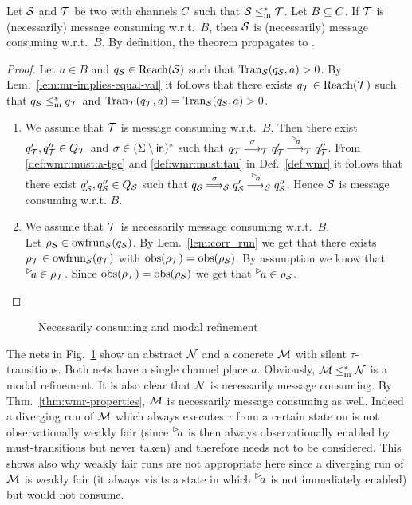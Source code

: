 \begin{theorem}\label{thm:wmr-properties}
    Let $\S$ and $\T$ be two \MAIOTSs with channels $\chan$  such that $\S \mrw \T$.
Let $B \subseteq \chan$. 
If $\T$ is (necessarily) message consuming w.r.t.\ $B$, then $\S$ is (necessarily) message consuming w.r.t.\ $B$.
By definition, the theorem propagates to \MAIOPNs.
\end{theorem}
\begin{proof}
	Let $a \in B$ and $q_\S \in \reach(\S)$ such that $\val_\S(q_\S,a) > 0$.
 By Lem.~\ref{lem:mr-implies-equal-val} it follows that there exists $q_\T \in \reach(\T)$ such that $q_\S \mrw q_\T$
and $\val_\T(q_\T,a) = \val_\S(q_\S,a) > 0$.
\begin{enumerate}
\item We assume that $\T$ is message consuming w.r.t.\ $B$.
   Then there exist $q'_\T,q''_\T \in Q_\T$ and $\sigma \in (\Sigma \setminus \inset)^*$ such that $q_\T \mustw{\sigma}_\T q'_\T \must{\inact{a}}_\T q''_\T$. From \ref{def:wmr:must:a-tgc} and \ref{def:wmr:must:tau} in Def.~\ref{def:wmr} it follows that
 there exist $q'_\S,q''_\S \in Q_\S$ such that $q_\S \mustw{\sigma}_\S q'_\S \must{\inact{a}}_\S q''_\S$. Hence $\S$ is message consuming w.r.t. $B$.
\item We assume that $\T$ is necessarily message consuming w.r.t.\ $B$.\\
   Let $\rho_\S \in \wfrun{\S}(q_\S)$.
    By Lem.~\ref{lem:corr_run} we get that there exists $\rho_\T \in \wfrun{\S}(q_\T)$ with $\obsa(\rho_\T)=\obsa(\rho_\S)$. By assumption we know that $\inact{a} \in \rho_\T$. Since $\obsa(\rho_\T)=\obsa(\rho_\S)$ we get that $\inact{a} \in \rho_\S$.
\end{enumerate}
\end{proof}

\begin{figure}[ht]
\centering
{}\quad
{}
\caption{Necessarily consuming and modal refinement}
\label{fig:ref}%
\end{figure}

\begin{example}
The nets in Fig.~\ref{fig:ref} show an abstract \MAIOPN $\pnN$ and a concrete \MAIOPN $\M$ with silent $\tau$-transitions.
Both nets have a single channel place $a$.
Obviously, $\M \mrw \pnN$ is a modal refinement. It is also clear that $\pnN$ is necessarily message consuming.
By Thm.~\ref{thm:wmr-properties}, $\M$ is necessarily message consuming as well.
Indeed a diverging run of $\M$ which always executes $\tau$ from a certain state on
is not observationally weakly fair (since $\inact{a}$ is then always observationally enabled by must-transitions but never taken)
and therefore needs not to be considered. 
This shows also why
weakly fair runs are not appropriate here since a diverging run of $\M$ is weakly fair (it always visits
a state in which $\inact{a}$ is not immediately enabled) but would not consume.   
\end{example}

